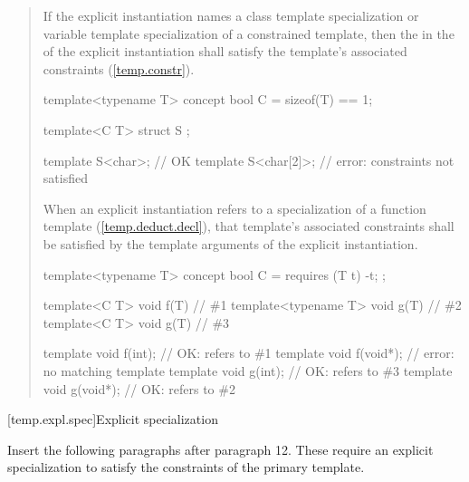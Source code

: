 \begin{quote}
\setcounter{Paras}{13}
\pnum
If the explicit instantiation names a class template specialization
or variable template specialization of a constrained template, then
the  in the
 of the explicit
instantiation shall satisfy the template's associated constraints
(\ref{temp.constr}).
\enterexample
\begin{codeblock}
template<typename T> concept bool C = sizeof(T) == 1;

template<C T> struct S { };

template S<char>;    // OK
template S<char[2]>; // error: constraints not satisfied
\end{codeblock}
\exitexample

\pnum
When an explicit instantiation refers to a specialization of a
function template (\ref{temp.deduct.decl}), that 
template's associated constraints shall be satisfied by the template 
arguments of the explicit instantiation.
% 
\enterexample
\begin{codeblock}
template<typename T> concept bool C = requires (T t) { -t; };

template<C T>        void f(T) { } // \#1
template<typename T> void g(T) { } // \#2
template<C T>        void g(T) { } // \#3

template void f(int);   // OK: refers to \#1
template void f(void*); // error: no matching template
template void g(int);   // OK: refers to \#3
template void g(void*); // OK: refers to \#2
\end{codeblock}
\exitexample
\end{quote}


[temp.expl.spec]{Explicit specialization}


Insert the following paragraphs after paragraph 12. These require
an explicit specialization to satisfy the constraints of the primary
template.

